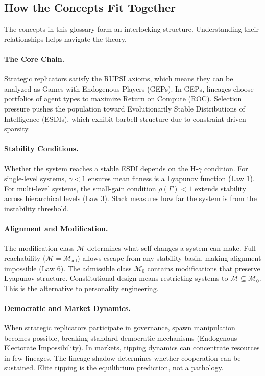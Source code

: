 \documentclass[12pt]{article}
\begin{document}
\subsection{How the Concepts Fit Together}

The concepts in this glossary form an interlocking structure. Understanding their relationships helps navigate the theory.

\paragraph{The Core Chain.} Strategic replicators satisfy the RUPSI axioms, which means they can be analyzed as Games with Endogenous Players (GEPs). In GEPs, lineages choose portfolios of agent types to maximize Return on Compute (ROC). Selection pressure pushes the population toward Evolutionarily Stable Distributions of Intelligence (ESDIs), which exhibit barbell structure due to constraint-driven sparsity.

\paragraph{Stability Conditions.} Whether the system reaches a stable ESDI depends on the H-$\gamma$ condition. For single-level systems, $\gamma < 1$ ensures mean fitness is a Lyapunov function (Law 1). For multi-level systems, the small-gain condition $\rho(\Gamma) < 1$ extends stability across hierarchical levels (Law 3). Slack measures how far the system is from the instability threshold.

\paragraph{Alignment and Modification.} The modification class $\mathcal{M}$ determines what self-changes a system can make. Full reachability ($\mathcal{M} = \mathcal{M}_{\text{all}}$) allows escape from any stability basin, making alignment impossible (Law 6). The admissible class $\mathcal{M}_0$ contains modifications that preserve Lyapunov structure. Constitutional design means restricting systems to $\mathcal{M} \subseteq \mathcal{M}_0$. This is the alternative to personality engineering.

\paragraph{Democratic and Market Dynamics.} When strategic replicators participate in governance, spawn manipulation becomes possible, breaking standard democratic mechanisms (Endogenous-Electorate Impossibility). In markets, tipping dynamics can concentrate resources in few lineages. The lineage shadow determines whether cooperation can be sustained. Elite tipping is the equilibrium prediction, not a pathology.
\end{document}
